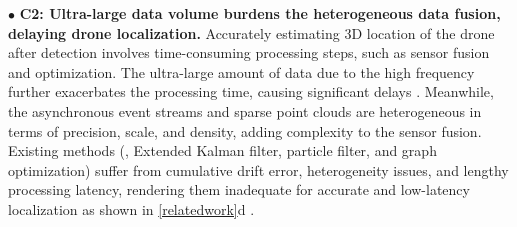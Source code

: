 
\noindent $\bullet$ \textbf{C2: Ultra-large data volume burdens the heterogeneous data fusion, delaying drone localization.}
Accurately estimating 3D location of the drone after detection involves time-consuming processing steps, such as sensor fusion and optimization. 
The ultra-large amount of data due to the high frequency further exacerbates the processing time, causing significant delays \cite{xu2021followupar}.
Meanwhile, the asynchronous event streams and sparse point clouds are heterogeneous in terms of precision, scale, and density, adding complexity to the sensor fusion.
Existing methods (\eg, Extended Kalman filter, particle filter, and graph optimization) suffer from cumulative drift error, heterogeneity issues, and lengthy processing latency, rendering them inadequate for accurate and low-latency localization as shown in \fig \ref{relatedwork}d \cite{zhao20213d, falanga2020dynamic, mitrokhin2018event, grisetti2010tutorial}.


